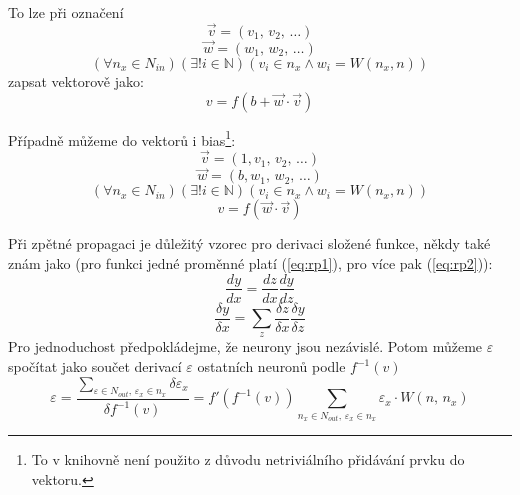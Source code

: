 \documentclass[12pt]{report}			%
\newcommand{\N}{\mathbb{N}}   			%
\begin{document}
				To lze při označení
				\begin{equation} \vec{v} = (v_{1},\,v_{2},\,\ldots) \end{equation}
				\begin{equation} \vec{w} = (w_{1},\,w_{2},\,\ldots) \end{equation}
				\begin{equation} \left(\forall n_x \in N_{in}\right)\left(\exists! i \in \N\right)\left(v_i \in n_x \land w_i = W(n_x, n)\right) \end{equation}
				zapsat vektorově jako:
				\begin{equation} v = f\left(b + \vec{w} \cdot \vec{v} \right) \end{equation}
				
				Případně můžeme do vektorů  i bias\footnote{To v knihovně není použito z důvodu netriviálního přidávání prvku do vektoru.}:
				\begin{equation} \vec{v} = (1, v_{1},\,v_{2},\,\ldots) \end{equation}
				\begin{equation} \vec{w} = (b, w_{1},\,w_{2},\,\ldots) \end{equation}
				\begin{equation} \left(\forall n_x \in N_{in}\right)\left(\exists! i \in \N\right)\left(v_i \in n_x \land w_i = W(n_x, n)\right) \end{equation}
				\begin{equation} v = f\left(\vec{w} \cdot \vec{v} \right) \end{equation}
				
				Při zpětné propagaci je důležitý vzorec pro derivaci složené funkce, někdy také znám jako  (pro funkci jedné proměnné platí (\ref{eq:rp1}), pro více pak (\ref{eq:rp2})):
				\begin{equation} \frac{dy}{dx} = \frac{dz}{dx}\frac{dy}{dz} \label{eq:rp1} \end{equation}
				\begin{equation} \frac{\delta y}{\delta x} = \sum_z\frac{\delta z}{\delta x}\frac{\delta y}{\delta z} \label{eq:rp2} \end{equation}
				Pro jednoduchost předpokládejme, že neurony jsou nezávislé. Potom můžeme $\varepsilon$ spočítat jako součet derivací $\varepsilon$ ostatních neuronů podle $f^{-1}(v)$
				\begin{equation} \varepsilon = \frac{\sum_{\varepsilon \in N_{out},\,\varepsilon_x \in n_x} \delta\varepsilon_x}{\delta f^{-1}(v)} = f'\left(f^{-1}(v)\right) \sum_{n_x \in N_{out},\,\varepsilon_x \in n_x} \varepsilon_x \cdot W\left(n,\,n_x\right) \end{equation}
				
\end{document}
